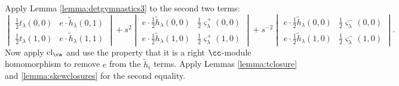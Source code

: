 Apply Lemma \ref{lemma:detgymnastics3} to the second two terms:
\[
\begin{vmatrix}
\frac{1}{2} t_\lambda(0,0) & e \cdot \tilde{h}_\lambda(0,1) \\
\frac{1}{2} t_\lambda(1,0) & e \cdot \tilde{h}_\lambda(1,1)
\end{vmatrix}
+ s^2
\begin{vmatrix}
e \cdot \frac{1}{2}\tilde{h}_\lambda(0,0) & \frac{1}{2} \varsigma_\lambda^+(0,0) \\
e \cdot \frac{1}{2}\tilde{h}_\lambda(1,0) & \frac{1}{2} \varsigma_\lambda^+(1,0)
\end{vmatrix}
+ s^{-2}
\begin{vmatrix}
e \cdot \frac{1}{2}\tilde{h}_\lambda(0,0) & \frac{1}{2} \varsigma_\lambda^-(0,0) \\
e \cdot \frac{1}{2}\tilde{h}_\lambda(1,0) & \frac{1}{2} \varsigma_\lambda^-(1,0)
\end{vmatrix}.
\]
Now apply $\cl_\ca$ and use the property that it is a right $\cc$-module homomorphism to remove $e$ from the $\tilde{h}_i$ terms. Apply Lemmas \ref{lemma:tclosure} and \ref{lemma:skewclosures} for the second equality.
